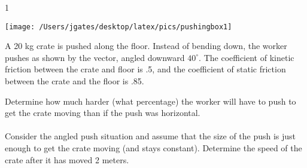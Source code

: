 
\AddToShipoutPicture*{\BackgroundPic}

\addtocounter {ProbNum} {1}

\begin{floatingfigure}[r]{.22\textwidth}
\texttt{[image: /Users/jgates/desktop/latex/pics/pushingbox1]}
\end{floatingfigure}
 
{\bf \Large{}} A 20 kg crate is pushed along the floor.  Instead of bending down, the worker pushes as shown by the vector, angled downward $40^\circ$. The coefficient of kinetic friction between the crate and floor is .5, and the coefficient of static friction between the crate and the floor is .85.
\bigskip

Determine how much harder (what percentage) the worker will have to push to get the crate moving than if the push was horizontal. \paragraph{}
\noindent
\vfill

\bigskip
Consider the angled push situation and assume that the size of the push is just enough to get the crate moving (and stays constant). Determine the speed of the crate after it has moved 2 meters.
\vfill
\newpage